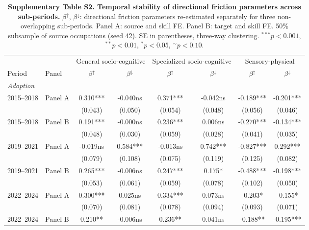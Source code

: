 \begin{table}[ht]
\centering\small
\caption{\textbf{Supplementary Table S2. Temporal stability of directional
  friction parameters across sub-periods.}
  $\beta^{\uparrow}$, $\beta^{\downarrow}$: directional friction parameters
  re-estimated separately for three non-overlapping sub-periods.
  Panel A: source and skill FE. Panel B: target and skill FE.
  50\% subsample of source occupations (seed 42).
  SE in parentheses, three-way clustering.
  $^{***}p<0.001$, $^{**}p<0.01$, $^{*}p<0.05$, $^{\sim}p<0.10$.}
\label{tab:SI_S2}
\begin{tabular}{llcccccc}
\toprule
 & & \multicolumn{2}{c}{General socio-cognitive} & \multicolumn{2}{c}{Specialized socio-cognitive} & \multicolumn{2}{c}{Sensory-physical} \\
\cmidrule(lr){3-4}\cmidrule(lr){5-6}\cmidrule(lr){7-8}
Period & Panel & $\beta^{\uparrow}$ & $\beta^{\downarrow}$ & $\beta^{\uparrow}$ & $\beta^{\downarrow}$ & $\beta^{\uparrow}$ & $\beta^{\downarrow}$ \\
\midrule
\multicolumn{8}{l}{\textit{Adoption}} \\
\multirow{2}{*}{2015–2018} & Panel A & 0.310*** & -0.040ns & 0.371*** & -0.042ns & -0.189*** & -0.201*** \\
 & & (0.043) & (0.050) & (0.054) & (0.048) & (0.056) & (0.046) \\
\multirow{2}{*}{2015–2018} & Panel B & 0.191*** & -0.000ns & 0.236*** & 0.006ns & -0.270*** & -0.134*** \\
 & & (0.048) & (0.030) & (0.059) & (0.028) & (0.041) & (0.035) \\
\multirow{2}{*}{2019–2021} & Panel A & -0.019ns & 0.584*** & -0.013ns & 0.742*** & -0.827*** & 0.292*** \\
 & & (0.079) & (0.108) & (0.075) & (0.119) & (0.125) & (0.082) \\
\multirow{2}{*}{2019–2021} & Panel B & 0.265*** & -0.006ns & 0.247*** & 0.175* & -0.488*** & -0.198*** \\
 & & (0.053) & (0.061) & (0.059) & (0.078) & (0.102) & (0.050) \\
\multirow{2}{*}{2022–2024} & Panel A & 0.300*** & 0.025ns & 0.334*** & 0.073ns & -0.203* & -0.155* \\
 & & (0.070) & (0.081) & (0.078) & (0.094) & (0.093) & (0.071) \\
\multirow{2}{*}{2022–2024} & Panel B & 0.210** & -0.006ns & 0.236** & 0.041ns & -0.188** & -0.195*** \\

\end{tabular}
\end{table}
